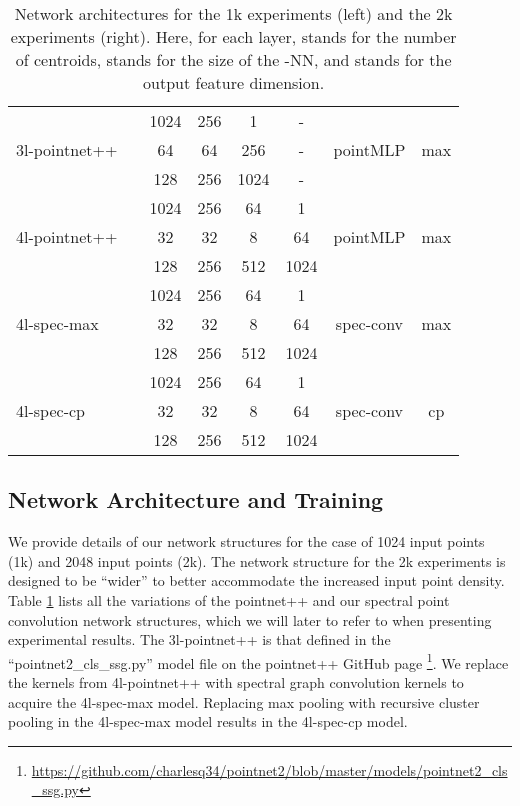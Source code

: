 \documentclass[runningheads]{llncs}
\begin{document}
\begin{table}[!ht]
{{\begin{tabular}{l c | c c c c |c|c}
				\multirow{3}{*}{3l-pointnet++} &  & 1024 &  256 & 1 & - &  & \multirow{3}{*}{max} \\
				&   &  64   & 64  & 256  & -& pointMLP \\
				&   & 128   & 256  & 1024  & - &    \\
				\hline			
				\multirow{3}{*}{4l-pointnet++} &  &  1024 & 256 & 64 & 1 & & \multirow{3}{*}{max} \\
				&   & 32   & 32  & 8  & 64 & pointMLP   \\
				&   & 128   & 256  & 512  & 1024 &    \\
				\hline	
				\hline	
				\multirow{3}{*}{4l-spec-max} &  &  1024 & 256 & 64 & 1 & & \multirow{3}{*}{max} \\
				&   & 32   & 32  & 8  & 64 & spec-conv  \\
				&   & 128   & 256  & 512  & 1024 &    \\
				\hline	
				\multirow{3}{*}{4l-spec-cp} &  &  1024 & 256 & 64 & 1 & &\multirow{3}{*}{cp} \\
				&   & 32   & 32  & 8  & 64 & spec-conv \\
				&   & 128   & 256  & 512  & 1024 &    \\
				\hline	
				
			\end{tabular}
		}
	}
	\vspace{0.4cm}
	\caption{Network architectures for the 1k experiments (left) and the 2k experiments (right). Here, for each layer,  stands for the number of centroids,  stands for the size of the -NN, and  stands for the output feature dimension.}
	\vspace{-1.0cm} 
	\label{tab:Architecture}
\end{table}


\subsection{Network Architecture and Training}\label{sec:net_arch}
We provide details of our network structures for the case of 1024 input points (1k) and 2048 input points (2k). The network structure for the 2k experiments is designed to be ``wider'' to better accommodate the increased input point density. Table \ref{tab:Architecture} lists all the variations of the pointnet++ and our spectral point convolution network structures, which we will later to refer to when presenting experimental results. The 3l-pointnet++ is that defined in the ``pointnet2\_cls\_ssg.py'' model file on the pointnet++ GitHub page \footnote{\small \url{https://github.com/charlesq34/pointnet2/blob/master/models/pointnet2_cls_ssg.py}}. We replace the kernels from 4l-pointnet++ with spectral graph convolution kernels to acquire the 4l-spec-max model. Replacing max pooling with recursive cluster pooling in the 4l-spec-max model results in the 4l-spec-cp model. 
\end{document}
